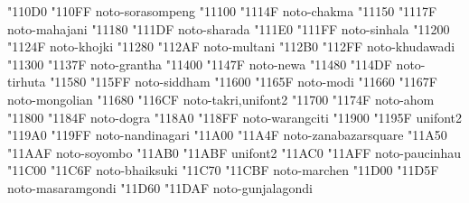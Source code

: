\documentclass{article}
\begin{document}
                                       { "110D0} { "110FF} {noto-sorasompeng}
                                             { "11100} { "1114F} {noto-chakma}
                                           { "11150} { "1117F} {noto-mahajani}
                                            { "11180} { "111DF} {noto-sharada}
                            { "111E0} { "111FF} {noto-sinhala}
                                             { "11200} { "1124F} {noto-khojki}
                                            { "11280} { "112AF} {noto-multani}
                                          { "112B0} { "112FF} {noto-khudawadi}
                                            { "11300} { "1137F} {noto-grantha}
                                               { "11400} { "1147F} {noto-newa}
                                            { "11480} { "114DF} {noto-tirhuta}
                                            { "11580} { "115FF} {noto-siddham}
                                               { "11600} { "1165F} {noto-modi}
                               { "11660} { "1167F} {noto-mongolian}
                                              { "11680} { "116CF} {noto-takri,unifont2}
                                               { "11700} { "1174F} {noto-ahom}
                                              { "11800} { "1184F} {noto-dogra}
                                        { "118A0} { "118FF} {noto-warangciti}
                                        { "11900} { "1195F} {unifont2}
                                        { "119A0} { "119FF} {noto-nandinagari}
                                   { "11A00} { "11A4F} {noto-zanabazarsquare}
                                            { "11A50} { "11AAF} {noto-soyombo}
   { "11AB0} { "11ABF} {unifont2}
                                        { "11AC0} { "11AFF} {noto-paucinhau}
                                          { "11C00} { "11C6F} {noto-bhaiksuki}
                                            { "11C70} { "11CBF} {noto-marchen}
                                      { "11D00} { "11D5F} {noto-masaramgondi}
                                      { "11D60} { "11DAF} {noto-gunjalagondi}
\end{document}
